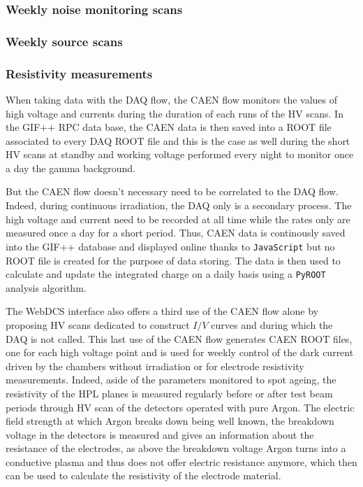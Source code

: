 		\subsubsection{Weekly noise monitoring scans}
		\label{chapt5:sssec:noisescan}
	
		\subsubsection{Weekly source scans}
		\label{chapt5:sssec:sourcescan}
	
		\subsubsection{Resistivity measurements}
		\label{chapt5:sssec:resistivity}
	
	When taking data with the DAQ flow, the CAEN flow monitors the values of high voltage and currents during the duration of each runs of the HV scans. In the GIF++ RPC data base, the CAEN data is then saved into a ROOT file associated to every DAQ ROOT file and this is the case as well during the short HV scans at standby and working voltage performed every night to monitor once a day the gamma background.
	
	But the CAEN flow doesn't necessary need to be correlated to the DAQ flow. Indeed, during continuous irradiation, the DAQ only is a secondary process. The high voltage and current need to be recorded at all time while the rates only are measured once a day for a short period. Thus, CAEN data is continously saved into the GIF++ database and displayed online thanks to \texttt{JavaScript} but no ROOT file is created for the purpose of data storing. The data is then used to calculate and update the integrated charge on a daily basis using a \texttt{PyROOT} analysis algorithm.
	
	The WebDCS interface also offers a third use of the CAEN flow alone by proposing HV scans dedicated to construct $I/V$ curves and during which the DAQ is not called. This last use of the CAEN flow generates CAEN ROOT files, one for each high voltage point and is used for weekly control of the dark current driven by the chambers without irradiation or for electrode resistivity measurements. Indeed, aside of the parameters monitored to spot ageing, the resistivity of the HPL planes is measured regularly before or after test beam periods through HV scan of the detectors operated with pure Argon. The electric field strength at which Argon breaks down being well known, the breakdown voltage in the detectors is measured and gives an information about the resistance of the electrodes, as above the breakdown voltage Argon turns into a conductive plasma and thus does not offer electric resistance anymore, which then can be used to calculate the resistivity of the electrode material.
		
